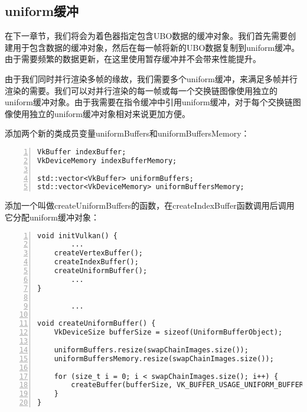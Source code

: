 \documentclass{ctexart}
\begin{document}
\subsection{uniform缓冲}

在下一章节，我们将会为着色器指定包含UBO数据的缓冲对象。我们首先需要创建用于包含数据的缓冲对象，然后在每一帧将新的UBO数据复制到uniform缓冲。由于需要频繁的数据更新，在这里使用暂存缓冲并不会带来性能提升。

由于我们同时并行渲染多帧的缘故，我们需要多个uniform缓冲，来满足多帧并行渲染的需要。我们可以对并行渲染的每一帧或每一个交换链图像使用独立的uniform缓冲对象。由于我需要在指令缓冲中引用uniform缓冲，对于每个交换链图像使用独立的uniform缓冲对象相对来说更加方便。

添加两个新的类成员变量uniformBuffers和uniformBuffersMemory：

\begin{lstlisting}[language={[ANSI]C},keywordstyle=\color{blue!70},commentstyle=\color{red!50!green!50!blue!50},frame=shadowbox, rulesepcolor=\color{red!20!green!20!blue!20},basicstyle=\small,numbers=left, numberstyle=\tiny,breaklines=true]
VkBuffer indexBuffer;
VkDeviceMemory indexBufferMemory;

std::vector<VkBuffer> uniformBuffers;
std::vector<VkDeviceMemory> uniformBuffersMemory;
\end{lstlisting}

添加一个叫做createUniformBuffers的函数，在createIndexBuffer函数调用后调用它分配uniform缓冲对象：

\begin{lstlisting}[language={[ANSI]C},keywordstyle=\color{blue!70},commentstyle=\color{red!50!green!50!blue!50},frame=shadowbox, rulesepcolor=\color{red!20!green!20!blue!20},basicstyle=\small,numbers=left, numberstyle=\tiny,breaklines=true]
void initVulkan() {
		...
	createVertexBuffer();
	createIndexBuffer();
	createUniformBuffer();
		...
}

		...

void createUniformBuffer() {
	VkDeviceSize bufferSize = sizeof(UniformBufferObject);

	uniformBuffers.resize(swapChainImages.size());
	uniformBuffersMemory.resize(swapChainImages.size());

	for (size_t i = 0; i < swapChainImages.size(); i++) {
		createBuffer(bufferSize, VK_BUFFER_USAGE_UNIFORM_BUFFER_BIT, VK_MEMORY_PROPERTY_HOST_VISIBLE_BIT | VK_MEMORY_PROPERTY_HOST_COHERENT_BIT, uniformBuffers[i], uniformBuffersMemory[i]);
	}
}
\end{lstlisting}
\end{document}
